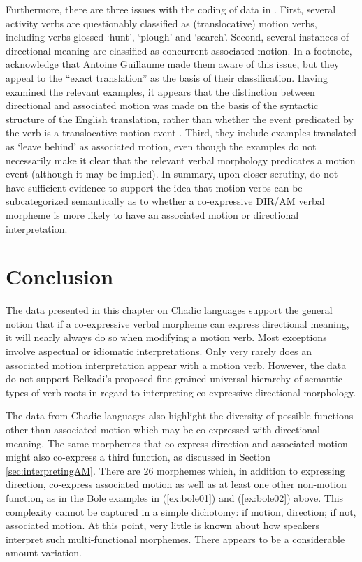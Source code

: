 Furthermore, there are three issues with the coding of data in \citet{genettiDirectionAssociatedMotion2020}. First, several activity verbs are questionably classified as (translocative) motion verbs, including verbs glossed `hunt', `plough' and `search'. Second, several instances of directional meaning are classified as concurrent associated motion. In a footnote, \citet[370]{genettiDirectionAssociatedMotion2020} acknowledge that Antoine Guillaume made them aware of this issue, but they appeal to the ``exact translation'' as the basis of their classification. Having examined the relevant examples, it appears that the distinction between directional and associated motion was made on the basis of the syntactic structure of the English translation, rather than whether the event predicated by the verb is a translocative motion event \citep[as defined by][]{guillaumeAssociatedMotionSouth2016}. Third, they include examples translated as `leave behind' as associated motion, even though the examples do not necessarily make it clear that the relevant verbal morphology predicates a motion event (although it may be implied). In summary, upon closer scrutiny, \citet{genettiDirectionAssociatedMotion2020} do not have sufficient evidence to support the idea that motion verbs can be subcategorized semantically as to whether a co-expressive DIR/AM verbal morpheme is more likely to have an associated motion or directional interpretation. 



\section{Conclusion}

The data presented in this chapter on Chadic languages support the general notion that if a co-expressive verbal morpheme can express directional meaning, it will nearly always do so when modifying a motion verb. Most exceptions involve aspectual or idiomatic interpretations. Only very rarely does an associated motion interpretation appear with a motion verb. However, the data do not support Belkadi's \citeyear{belkadiAssociatedMotionConstructions2016} proposed fine-grained universal hierarchy of semantic types of verb roots in regard to interpreting co-expressive directional morphology. 

The data from Chadic languages also highlight the diversity of possible functions other than associated motion which may be co-expressed with directional meaning. The same morphemes that co-express direction and associated motion might also co-express a third function, as discussed in Section \ref{sec:interpretingAM}. There are 26 morphemes which, in addition to expressing direction, co-express associated motion as well as at least one other non-motion function, as in the \hyperref[bole]{Bole} examples in (\ref{ex:bole01}) and (\ref{ex:bole02}) above. This complexity cannot be captured in a simple dichotomy: if motion, direction; if not, associated motion. At this point, very little is known about how speakers interpret such multi-functional morphemes. There appears to be a considerable amount variation.

